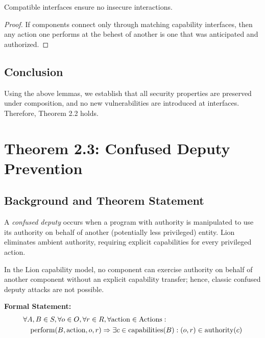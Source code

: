 \begin{lemma}
Compatible interfaces ensure no insecure interactions.
\end{lemma}

\begin{proof}
If components connect only through matching capability interfaces, then any action one performs at the behest of another is one that was anticipated and authorized.
\end{proof}

\subsection{Conclusion}

Using the above lemmas, we establish that all security properties are preserved under composition, and no new vulnerabilities are introduced at interfaces. Therefore, Theorem 2.2 holds.

\newpage

\section{Theorem 2.3: Confused Deputy Prevention}

\subsection{Background and Theorem Statement}

A \emph{confused deputy} occurs when a program with authority is manipulated to use its authority on behalf of another (potentially less privileged) entity. Lion eliminates ambient authority, requiring explicit capabilities for every privileged action.

\begin{theorem}
In the Lion capability model, no component can exercise authority on behalf of another component without an explicit capability transfer; hence, classic confused deputy attacks are not possible.

\textbf{Formal Statement:}
\begin{align}
&\forall A, B \in S, \forall o \in O, \forall r \in R, \forall \text{action} \in \text{Actions}: \nonumber \\
&\quad \text{perform}(B, \text{action}, o, r) \Rightarrow \exists c \in \text{capabilities}(B) : (o, r) \in \text{authority}(c)
\end{align}
\end{theorem}

